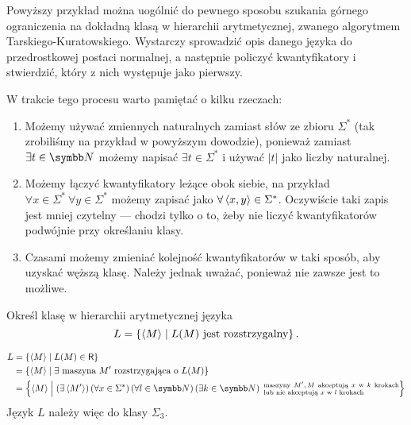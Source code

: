\begin{remark*}
    Powyższy przykład można uogólnić do pewnego sposobu szukania górnego ograniczenia na dokładną klasą w hierarchii arytmetycznej, zwanego algorytmem Tarskiego-Kuratowskiego. Wystarczy sprowadzić opis danego języka do przedrostkowej postaci normalnej, a następnie policzyć kwantyfikatory i stwierdzić, który z nich występuje jako pierwszy.

    W trakcie tego procesu warto pamiętać o kilku rzeczach:
    \begin{enumerate}
        \item Możemy używać zmiennych naturalnych zamiast słów ze zbioru $\Sigma^*$ (tak zrobiliśmy na przykład w powyższym dowodzie), ponieważ zamiast $\exists t \in \NN$ możemy napisać $\exists t \in \Sigma^*$ i używać $|t|$ jako liczby naturalnej.
        \item Możemy łączyć kwantyfikatory leżące obok siebie, na przykład $\forall x \in \Sigma^*\ \forall y \in \Sigma^*$ możemy zapisać jako $\forall \left\langle x, y \right\rangle \in \Sigma^*$. Oczywiście taki zapis jest mniej czytelny --- chodzi tylko o to, żeby nie liczyć kwantyfikatorów podwójnie przy określaniu klasy.
        \item Czasami możemy zmieniać kolejność kwantyfikatorów w taki sposób, aby uzyskać węższą klasę. Należy jednak uważać, ponieważ nie zawsze jest to możliwe.
    \end{enumerate}
\end{remark*}

\begin{example}
    Określ klasę w hierarchii arytmetycznej języka
    \[ L = \left\{\left\langle M \right\rangle \mid L(M) \text{ jest rozstrzygalny}\right\}. \]
\end{example}
\begin{solution}
    \begin{align*}
        L &= \left\{\encode{M} \mid L(M) \in \Rclass \right\} \\
        &= \left\{\encode{M} \mid \exists \text{ maszyna } M' \text{ rozstrzygająca o } L(M) \right\} \\
        &= \left\{\encode{M} \Bigm| \left(\exists\encode{M'}\right) \left(\forall x \in \Sigma^*\right) \left(\forall l \in \NN\right) \left(\exists k \in \NN\right)\; \parbox{15em}{\scriptsize maszyny $M', M$ akceptują $x$ w $k$ krokach lub nie akceptują $x$ w $l$ krokach} \right\} \\
    \end{align*}
    Język $L$ należy więc do klasy $\Sigma_3$.
\end{solution}